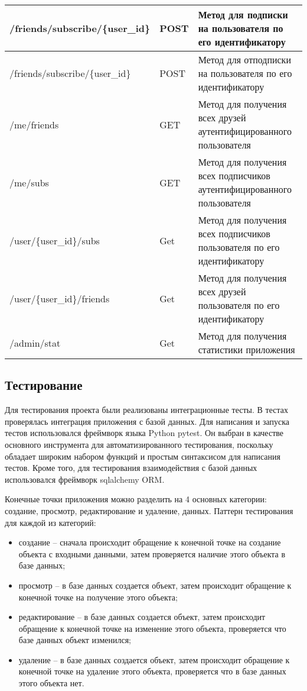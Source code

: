 \begin{landscape}
\begin{longtable}{|p{}|p{}|p{}|}
		/friends/subscribe/\{user\_id\}                & POST & Метод для подписки на пользователя по его идентификатору \\\hline
		/friends/subscribe/\{user\_id\}                & POST & Метод для отподписки на пользователя по его идентификатору \\\hline
		/me/friends  				& GET & Метод для получения всех друзей аутентифицированного пользователя  \\\hline
		/me/subs  				& GET & Метод для получения всех подписчиков аутентифицированного пользователя  \\\hline
		/user/\{user\_id\}/subs             & Get & Метод для получения всех подписчиков  пользователя  по его идентификатору\\\hline
		/user/\{user\_id\}/friends             & Get & Метод для получения всех друзей  пользователя  по его идентификатору\\\hline
		
		/admin/stat  & Get & Метод для получения статистики приложения \\\hline
	\end{longtable}
\end{landscape}

\subsection{Тестирование}
Для тестирования проекта были реализованы интеграционные тесты. В тестах проверялась интеграция приложения с базой данных. Для написания и запуска тестов использовался фреймворк языка Python pytest\cite{pytest}. Он выбран в качестве основного инструмента для автоматизированного тестирования, поскольку обладает широким набором функций и простым синтаксисом для написания тестов. Кроме того, для тестирования взаимодействия с базой данных использовался фреймворк sqlalchemy ORM\cite{sqlalchemy}.

Конечные точки приложения можно разделить на 4 основных категории: создание, просмотр, редактирование и удаление, данных.
Паттерн тестирования для каждой из категорий:
\begin{itemize}[leftmargin=1.6\parindent]
	\item создание -- сначала происходит обращение к конечной точке на создание объекта с входными данными, затем проверяется наличие этого объекта в базе данных;
	\item просмотр -- в базе данных создается объект, затем происходит обращение к конечной точке на получение  этого объекта;
	\item редактирование -- в базе данных создается объект, затем происходит обращение к конечной точке на изменение этого объекта, проверяется что базе данных объект изменился;
	\item удаление -- в базе данных создается объект, затем происходит обращение к конечной точке на удаление этого объекта, проверяется что в базе данных этого объекта нет.
\end{itemize}

